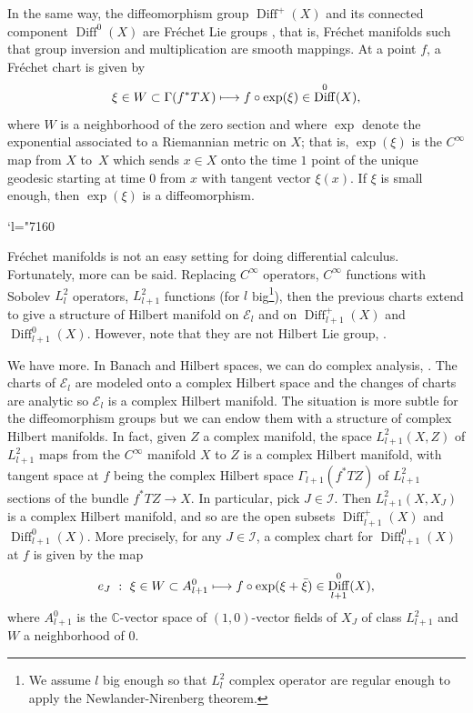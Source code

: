 \documentclass[10pt]{amsart}
\let\mathcal\mathscr
\newcommand{\Changel}{\mathcode`l="7160}
\def\mto{\mathchoice{\longmapsto}{\mapsto}{\mapsto}{\mapsto}}
\DeclareMathOperator{\Diff}{Diff}
\theoremstyle{plain}
\theoremstyle{definition}
\theoremstyle{remark}
\numberwithin{equation}{section}
\newcommand{\CC}{{\mathbb{C}}}
\newcommand{\cI}{\mathcal{I}}
\begin{document}
In the same way, the diffeomorphism group $\Diff^+(X)$ and its connected component $\Diff^0(X)$ are Fréchet Lie groups \cite{Les1}, that is, Fréchet manifolds such that group inversion and multiplication are smooth mappings. At a point $f$, a Fréchet chart is given by
\begin{equation}
\label{Frechetchart}
\xi\in W\subset \Gamma(f^*TX)\mto f\circ\exp (\xi)\in \Diff^0 (X),
\end{equation}
where $W$ is a neighborhood of the zero section and where $\exp$ denote the exponential associated to a Riemannian metric on $X$; that is, $\exp(\xi)$ is the $C^\infty$ map from $X$ to~$X$ which sends $x\in X$ onto the time $1$ point of the unique geodesic starting at time $0$ from $x$ with tangent vector $\xi(x)$. If $\xi$ is small enough, then $\exp(\xi)$ is a diffeomorphism.

\Changel

Fréchet manifolds is not an easy setting for doing differential calculus.
Fortunately, more can be said. Replacing $C^\infty$ operators, \resp $C^\infty$ functions with Sobolev $L^2_l$ operators, \resp $L^2_{l+1}$ functions (for $l$ big\footnote{We assume $l$ big enough so that $L^2_l$ complex operator are regular enough to apply the Newlander-Nirenberg theorem.}), then the previous charts extend to give a structure of Hilbert manifold on $\mathcal E_l$ and on $\Diff^+_{l+1}(X)$ and $\Diff^{0}_{l+1}(X)$. However, note that they are not Hilbert Lie group, \cf \cite{MNR}.

We have more. In Banach and Hilbert spaces, we can do complex analysis, \cf \cite{Douady}. The charts of $\mathcal E_l$ are modeled onto a complex Hilbert space and the changes of charts are analytic so $\mathcal E_l$ is a complex Hilbert manifold. The situation is more subtle for the diffeomorphism groups but we can endow them with a structure of complex Hilbert manifolds. In fact, given $Z$ a complex manifold, the space $L^2_{l+1}(X,Z)$ of $L^2_{l+1}$ maps from the $C^\infty$ manifold $X$ to $Z$ is a complex Hilbert manifold, with tangent space at $f$ being the complex Hilbert space $\Gamma_{l+1}(f^*TZ)$ of $L^2_{l+1}$ sections of the bundle $f^*TZ\to X$. In particular, pick $J\in\cI$. Then $L^2_{l+1}(X,X_J)$ is a complex Hilbert manifold, and so are the open subsets $\Diff^+_{l+1}(X)$ and $\Diff^{0}_{l+1}(X)$. More precisely,
for any $J\in\cI$, a complex chart for $\Diff_{l+1}^0(X)$ at $f$ is given by the map
\begin{equation}
\label{chart}
e_J\ :\ \xi\in W\subset A^0_{l+1}\mto f\circ\exp (\xi+\bar \xi)\in \Diff_{l+1}^0 (X),
\end{equation}
where $A^0_{l+1}$ is the $\CC$-vector space of $(1,0)$-vector fields of $X_J$ of class $L^2_{l+1}$ and $W$ a neighborhood of $0$.
\end{document}
